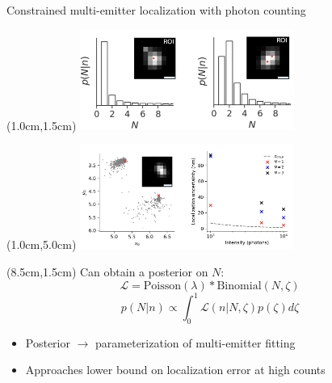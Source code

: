 \documentclass{beamer}					%
\begin{document}
\begin{frame}{Constrained multi-emitter localization with photon counting}

\begin{textblock*}{7cm}(1.0cm,1.5cm)
\includegraphics[width=7cm]{../../spad/spad/media/Figure-4.png}
\end{textblock*}

\begin{textblock*}{7cm}(1.0cm,5.0cm)
\includegraphics[width=7cm]{../../spad/spad/media/Figure-5.png}
\end{textblock*}


\begin{textblock*}{6cm}(8.5cm,1.5cm)
Can obtain a posterior on $N$:
\begin{equation*}
\mathcal{L} = \mathrm{Poisson}(\lambda)* \mathrm{Binomial}(N,\zeta)
\end{equation*}
\begin{equation*}
p(N\lvert n) \propto \int_{0}^{1} \mathcal{L}(n\lvert N,\zeta)p(\zeta)d\zeta
\end{equation*}
\vspace{1cm}
\begin{itemize}
\item Posterior $\rightarrow$ parameterization of multi-emitter fitting
\item Approaches lower bound on localization error at high counts
\end{itemize}
\end{textblock*}

\end{frame}
\end{document}
